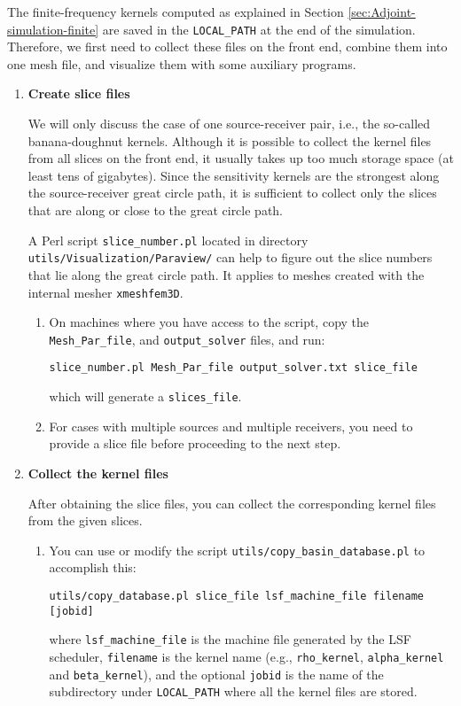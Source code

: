 The finite-frequency kernels computed as explained in Section \ref{sec:Adjoint-simulation-finite}
are saved in the \texttt{LOCAL\_PATH} at the end of the simulation.
Therefore, we first need to collect these files on the front end,
combine them into one mesh file, and visualize them with some auxiliary
programs.
\begin{enumerate}
\item \textbf{Create slice files}


We will only discuss the case of one source-receiver pair, i.e., the
so-called banana-doughnut kernels. Although it is possible to collect
the kernel files from all slices on the front end, it usually takes
up too much storage space (at least tens of gigabytes). Since the
sensitivity kernels are the strongest along the source-receiver great
circle path, it is sufficient to collect only the slices that are
along or close to the great circle path.\newline


A Perl script \texttt{slice\_number.pl} located in directory \texttt{utils/Visualization/Paraview/}
can help to figure out the slice numbers that lie along the great
circle path. It applies to meshes created with the internal mesher
\texttt{xmeshfem3D}.
\begin{enumerate}
\item On machines where you have access to the script, copy the \texttt{Mesh\_Par\_file},
and \texttt{output\_solver} files, and run:

{\small
\begin{verbatim}
slice_number.pl Mesh_Par_file output_solver.txt slice_file
\end{verbatim}
}
which will generate a \texttt{slices\_file}.

\item For cases with multiple sources and multiple receivers, you need to
provide a slice file before proceeding to the next step.
\end{enumerate}
\item \textbf{Collect the kernel files}


After obtaining the slice files, you can collect the corresponding
kernel files from the given slices.
\begin{enumerate}
\item You can use or modify the script \texttt{utils/copy\_basin\_database.pl}
to accomplish this:

{\small
\begin{verbatim}
utils/copy_database.pl slice_file lsf_machine_file filename [jobid]
\end{verbatim}
}
where \texttt{\small lsf\_machine\_file}{\small{} is the machine file
generated by the LSF scheduler, }\texttt{\small filename}{\small{}
is the kernel name (e.g., }\texttt{\small rho\_kernel}{\small , }\texttt{\small alpha\_kernel}{\small{}
and }\texttt{\small beta\_kernel}{\small ), and the optional }\texttt{\small jobid}{\small{}
is the name of the subdirectory under }\texttt{\small LOCAL\_PATH}{\small{}
where all the kernel files are stored.}{\small \par}


\end{enumerate}
\end{enumerate}
